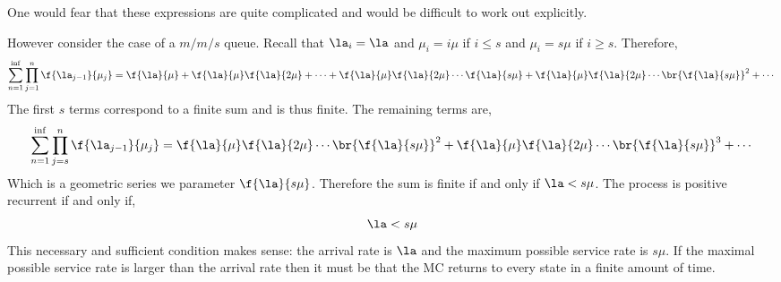 \documentclass{article}
\begin{document}
    One would fear that these expressions are quite complicated and would be difficult to work out explicitly.
    \begin{example}
        However consider the case of a $m/m/s$ queue. Recall that $\la_i = \la$ and $\mu_i = i \mu$ if $i \leq s$ and $\mu_i = s \mu$ if $i \geq s$. Therefore,
        \[ \sum_{n=1}^{\inf} \prod_{j=1}^{n}\f{\la_{j-1}}{\mu_j} = \f{\la}{\mu} + \f{\la}{\mu} \f{\la}{2\mu} + \cdots + \f{\la}{\mu}\f{\la}{2\mu}\cdots \f{\la}{s\mu} + \f{\la}{\mu}\f{\la}{2\mu}\cdots \br{\f{\la}{s\mu}}^2 +\cdots \]
        The first $s$ terms correspond to a finite sum and is thus finite. The remaining terms are,
        \[ \sum_{n=1}^{\inf} \prod_{j=s}^{n}\f{\la_{j-1}}{\mu_j} = \f{\la}{\mu}\f{\la}{2\mu}\cdots \br{\f{\la}{s\mu}}^2 + \f{\la}{\mu}\f{\la}{2\mu}\cdots \br{\f{\la}{s\mu}}^3 + \cdots \]
        Which is a geometric series we parameter $\f{\la}{s\mu}$. Therefore the sum is finite if and only if $\la < s \mu$. The process is positive recurrent if and only if,
        \[ \la < s \mu \]
        This necessary and sufficient condition makes sense: the arrival rate is $\la$ and the maximum possible service rate is $s \mu$. If the maximal possible service rate is larger than the arrival rate then it must be that the MC returns to every state in a finite amount of time.
    \end{example}
\end{document}
